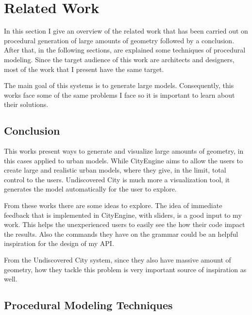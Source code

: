 
% 
% 

\section{Related Work}
\label{sec:related_work}

In this section I give an overview of the related work that has been carried out on procedural generation of large amounts of geometry followed by a conclusion. After that, in the following sections, are explained some techniques of procedural modeling.
Since the target audience of this work are architects and designers, most of the work that I present have the same target.

The main goal of this systems is to generate large models. Consequently, this works face some of the same problems I face so it is important to learn about their solutions. 






\subsection{Conclusion} %
\label{sub:conclusion}

This works present ways to generate and visualize large amounts of geometry, in this cases applied to urban models. While CityEngine \cite{Parish2001} aims to allow the users to create large and realistic urban models, where they give, in the limit, total control to the users. Undiscovered City\cite{Greuter2003} is much more a visualization tool, it generates the model automatically for the user to explore.

From these works there are some ideas to explore. The idea of immediate feedback that is implemented in CityEngine, with sliders, is a good input to my work. This helps the unexperienced users to easily see the how their code impact the results. Also the commands they have on the grammar could be an helpful inspiration for the design of my API.

From the Undiscovered City system, since they also have massive amount of geometry, how they tackle this problem is very important source of inspiration as well.

\subsection{Procedural Modeling Techniques} %
\label{sub:procedural_modeling_techniques}

